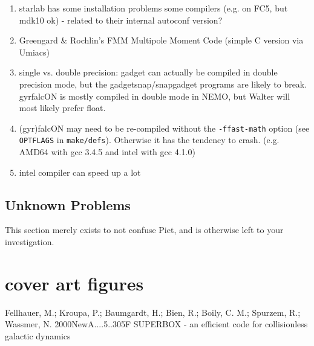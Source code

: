 \begin{enumerate}
\item
starlab has some installation
problems some compilers (e.g. on FC5, but mdk10 ok) - related to their internal
autoconf version?

\item
Greengard \& Rochlin's FMM Multipole Moment Code (simple C version via Umiacs)

\item
single vs. double precision:  gadget can actually be compiled in double precision
mode, but the gadgetsnap/snapgadget programs are likely to break.  gyrfalcON is
mostly compiled in double mode in NEMO, but Walter will most likely
prefer float.

\item 
(gyr)falcON may need to be re-compiled without the  {\tt -ffast-math} option
(see {\tt OPTFLAGS} in  {\tt make/defs}). Otherwise it has the tendency to crash.
(e.g. AMD64 with gcc 3.4.5 and intel with gcc 4.1.0)

\item 
intel compiler can speed up a lot 

\end{enumerate}

\section{Unknown Problems}

This section merely exists to not confuse Piet, and is otherwise
left to your investigation.



\cleardoublepage
\chapter*{cover art figures}
\begin{figure}[t]
\end{figure}

\begin{figure}[b]
\end{figure}

\begin{figure}[b]
\end{figure}










Fellhauer, M.; Kroupa, P.; Baumgardt, H.; Bien, R.; Boily, C. M.; Spurzem, R.; Wassmer, N.
2000NewA....5..305F
SUPERBOX - an efficient code for collisionless galactic dynamics
